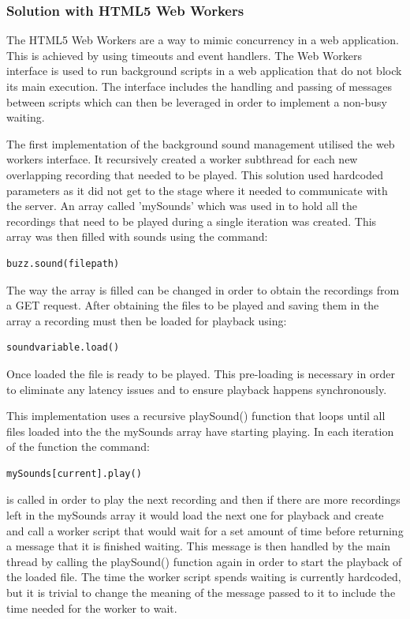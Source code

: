 \documentclass{l3proj}
\begin{document}
\subsubsection{Solution with HTML5 Web Workers}
The HTML5 Web Workers are a way to mimic concurrency in a web application. This is achieved by using timeouts and event handlers. The Web Workers interface is used to run background scripts in a web application that do not block its main execution. The interface includes the handling and passing of messages between scripts which can then be leveraged in order to implement a non-busy waiting.

The first implementation of the background sound management utilised the web workers interface. It recursively created a worker subthread for each new overlapping recording that needed to be played. This solution used hardcoded parameters as it did not get to the stage where it needed to communicate with the server. An array called 'mySounds' which was used in to hold all the recordings that need to be played during a single iteration was created. This array was then filled with sounds using the command:
\begin{verbatim}
buzz.sound(filepath)
\end{verbatim}
The way the array is filled can be changed in order to obtain the recordings from a GET request. After obtaining the files to be played and saving them in the array a recording must then be loaded for playback using:
\begin{verbatim}
soundvariable.load()
\end{verbatim}
Once loaded the file is ready to be played. This pre-loading is necessary in order to eliminate any latency issues and to ensure playback happens synchronously.

This implementation uses a recursive playSound() function that loops until all files loaded into the the mySounds array have starting playing. In each iteration of the function the command: 
\begin{verbatim}
mySounds[current].play()
\end{verbatim}
is called in order to play the next recording and then if there are more recordings left in the mySounds array it would load the next one for playback and create and call a worker script that would wait for a set amount of time before returning a message that it is finished waiting. This message is then handled by the main thread by calling the playSound() function again in order to start the playback of the loaded file. The time the worker script spends waiting is currently hardcoded, but it is trivial to change the meaning of the message passed to it to include the time needed for the worker to wait.
\end{document}
